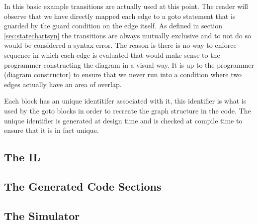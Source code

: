 In this basic example transitions are actually used at this point. The reader will observe that we have directly mapped each edge to a goto statement that is guarded by the guard condition on the edge itself. As defined in section \ref{sec:statechartsyn} the transitions are always mutually exclusive and to not do so would be considered a syntax error. The reason is there is no way to enforce sequence in which each edge is evaluated that would make sense to the programmer constructing the diagram in a visual way. It is up to the programmer (diagram constructor) to ensure that we never run into a condition where two edges actually have an area of overlap.

Each block has an unique identitifer associated with it, this identifier is what is used by the goto blocks in order to recreate the graph structure in the code. The unique identifier is generated at design time and is checked at compile time to ensure that it is in fact unique.


\subsection{The IL}
\subsection{The Generated Code Sections}
\subsection{The Simulator}